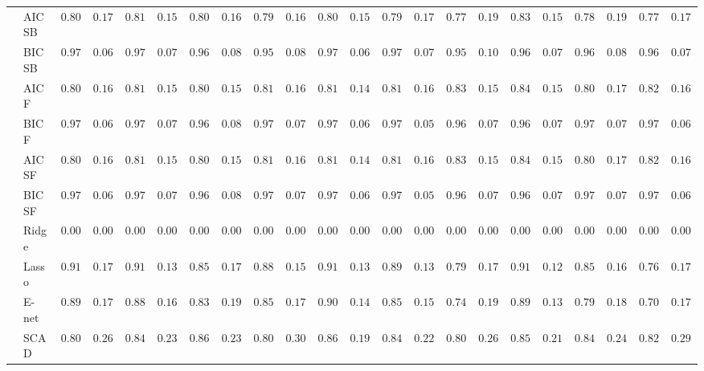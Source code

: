 \begin{tabular}{ll|ll|llllll|llllll|llllll}
 & AIC SB  & $0.8017$ & $0.1752$ & $0.8150$ & $0.1587$ & $0.8033$ & $0.1613$ & $0.7950$ & $0.1639$ & $0.8017$ & $0.1584$ & $0.7917$ & $0.1731$ & $0.7783$ & $0.1925$ & $0.8333$ & $0.1553$ & $0.7817$ & $0.1905$ & $0.7750$ & $0.1731$ \\
 & BIC SB  & $0.9717$ & $0.0672$ & $0.9717$ & $0.0713$ & $0.9650$ & $0.0864$ & $0.9583$ & $0.0898$ & $0.9700$ & $0.0686$ & $0.9717$ & $0.0713$ & $0.9500$ & $0.1019$ & $0.9650$ & $0.0796$ & $0.9633$ & $0.0840$ & $0.9650$ & $0.0796$ \\
 & AIC F  & $0.8050$ & $0.1659$ & $0.8150$ & $0.1587$ & $0.8067$ & $0.1584$ & $0.8133$ & $0.1680$ & $0.8100$ & $0.1499$ & $0.8167$ & $0.1615$ & $0.8300$ & $0.1553$ & $0.8400$ & $0.1552$ & $0.8083$ & $0.1714$ & $0.8217$ & $0.1663$ \\
 & BIC F  & $0.9717$ & $0.0672$ & $0.9717$ & $0.0713$ & $0.9650$ & $0.0864$ & $0.9717$ & $0.0713$ & $0.9700$ & $0.0686$ & $0.9783$ & $0.0563$ & $0.9650$ & $0.0796$ & $0.9683$ & $0.0738$ & $0.9700$ & $0.0726$ & $0.9750$ & $0.0643$ \\
 & AIC SF  & $0.8050$ & $0.1659$ & $0.8150$ & $0.1587$ & $0.8067$ & $0.1584$ & $0.8133$ & $0.1680$ & $0.8100$ & $0.1499$ & $0.8167$ & $0.1615$ & $0.8317$ & $0.1526$ & $0.8400$ & $0.1552$ & $0.8083$ & $0.1714$ & $0.8233$ & $0.1638$ \\
 & BIC SF  & $0.9717$ & $0.0672$ & $0.9717$ & $0.0713$ & $0.9650$ & $0.0864$ & $0.9717$ & $0.0713$ & $0.9700$ & $0.0686$ & $0.9783$ & $0.0563$ & $0.9667$ & $0.0786$ & $0.9683$ & $0.0738$ & $0.9700$ & $0.0726$ & $0.9750$ & $0.0643$ \\
 & Ridge  & $0.0000$ & $0.0000$ & $0.0000$ & $0.0000$ & $0.0000$ & $0.0000$ & $0.0000$ & $0.0000$ & $0.0000$ & $0.0000$ & $0.0000$ & $0.0000$ & $0.0000$ & $0.0000$ & $0.0000$ & $0.0000$ & $0.0000$ & $0.0000$ & $0.0000$ & $0.0000$ \\
 & Lasso  & $0.9167$ & $0.1733$ & $0.9133$ & $0.1371$ & $0.8583$ & $0.1747$ & $0.8817$ & $0.1541$ & $0.9183$ & $0.1329$ & $0.8917$ & $0.1369$ & $0.7917$ & $0.1794$ & $0.9183$ & $0.1265$ & $0.8567$ & $0.1642$ & $0.7633$ & $0.1791$ \\
 & E-net  & $0.8983$ & $0.1739$ & $0.8867$ & $0.1656$ & $0.8317$ & $0.1932$ & $0.8533$ & $0.1745$ & $0.9017$ & $0.1423$ & $0.8533$ & $0.1558$ & $0.7417$ & $0.1901$ & $0.8983$ & $0.1399$ & $0.7950$ & $0.1817$ & $0.7083$ & $0.1794$ \\
 & SCAD  & $0.8017$ & $0.2624$ & $0.8467$ & $0.2389$ & $0.8617$ & $0.2346$ & $0.8067$ & $0.3095$ & $0.8650$ & $0.1963$ & $0.8400$ & $0.2209$ & $0.8000$ & $0.2670$ & $0.8567$ & $0.2171$ & $0.8433$ & $0.2425$ & $0.8250$ & $0.2943$ \\

\end{tabular}
